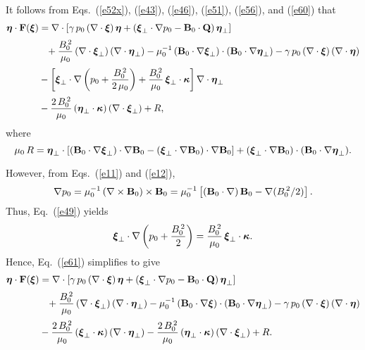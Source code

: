 \documentclass[12pt,prb,aps,notitlepage]{revtex4-1}
\newcommand{\bxi}{\mbox{\boldmath$\xi$}}
\newcommand{\bta}{\mbox{\boldmath$\eta$}}
\newcommand{\bkappa}{\mbox{\boldmath$\kappa$}}
\begin{document}
 It follows from Eqs.~(\ref{e52x}), (\ref{e43}), (\ref{e46}),  (\ref{e51}), (\ref{e56}), and (\ref{e60}) that
 \begin{align}\label{e61}
\bta\cdot {\bf F}(\bxi) &=\nabla\cdot\left[\gamma\,p_0\,(\nabla\cdot\bxi)\,\bta+ (\bxi_\perp\cdot\nabla p_0-{\bf B}_0\cdot{\bf Q})\,\bta_\perp\right]\nonumber\\[0.5ex]
&\phantom{=}+\frac{B_0^{\,2}}{\mu_0}\,(\nabla\cdot\bxi_\perp)\,(\nabla\cdot\bta_\perp) 
 -\mu_0^{-1}\,({\bf B}_0\cdot\nabla\bxi_\perp)\cdot
 ({\bf B}_0\cdot\nabla\bta_\perp)-\gamma\,p_0\,(\nabla\cdot\bxi)\,(\nabla\cdot\bta)\nonumber\\[0.5ex]
 &-\left[\bxi_\perp\cdot\nabla\left(p_0+\frac{B_0^{\,2}}{2\,\mu_0}\right)+ \frac{B_0^{\,2}}{\mu_0}\,\bxi_\perp\cdot\bkappa\right]\nabla\cdot\bta_\perp\nonumber
\\[0.5ex]&
-\frac{2\,B_0^{\,2}}{\mu_0}\,(\bta_\perp\cdot\bkappa)\,(\nabla\cdot\bxi_\perp) +R,
 \end{align}
 where
 \begin{equation}
 \mu_0\,R= \bta_\perp\cdot\left[({\bf B}_0\cdot\nabla\bxi_\perp)\cdot\nabla {\bf B}_0 - (\bxi_\perp\cdot\nabla {\bf B}_0)\cdot\nabla {\bf B}_0\right]
 + (\bxi_\perp\cdot\nabla {\bf B}_0)\cdot({\bf B}_0\cdot\nabla\bta_\perp).
 \end{equation}
 
 However, from Eqs.~(\ref{e11}) and (\ref{e12}), 
 \begin{equation}\label{e64}
 \nabla p_0 = \mu_0^{-1}\,(\nabla\times{\bf B}_0)\times {\bf B}_0= \mu_0^{-1}\left[({\bf B}_0\cdot\nabla)\,{\bf B}_0-\nabla(B_0^{\,2}/2)\right].
 \end{equation}
 Thus, Eq.~(\ref{e49}) yields
 \begin{equation}
 \bxi_\perp\cdot\nabla\left(p_0 +\frac{B_0^{\,2}}{2}\right) = \frac{B_0^{\,2}}{\mu_0}\,\bxi_\perp\cdot\bkappa.
 \end{equation}
 Hence, Eq.~(\ref{e61}) simplifies to give 
 \begin{align}\label{e65}
\bta\cdot {\bf F}(\bxi) &=\nabla\cdot\left[\gamma\,p_0\,(\nabla\cdot\bxi)\,\bta+ (\bxi_\perp\cdot\nabla p_0-{\bf B}_0\cdot{\bf Q})\,\bta_\perp\right]\nonumber\\[0.5ex]
&\phantom{=}+\frac{B_0^{\,2}}{\mu_0}\,(\nabla\cdot\bxi_\perp)\,(\nabla\cdot\bta_\perp) 
 - \mu_0^{-1}\,({\bf B}_0\cdot\nabla\bxi)\cdot
 ({\bf B}_0\cdot\nabla\bta_\perp)-\gamma\,p_0\,(\nabla\cdot\bxi)\,(\nabla\cdot\bta)\nonumber\\[0.5ex]
 &-\frac{2\,B_0^{\,2}}{\mu_0}\,(\bxi_\perp\cdot\bkappa)\, (\nabla\cdot\bta_\perp)-\frac{2\,B_0^{\,2}}{\mu_0}\,(\bta_\perp\cdot\bkappa)\,(\nabla\cdot\bxi_\perp) +R.
 \end{align}
\end{document}
